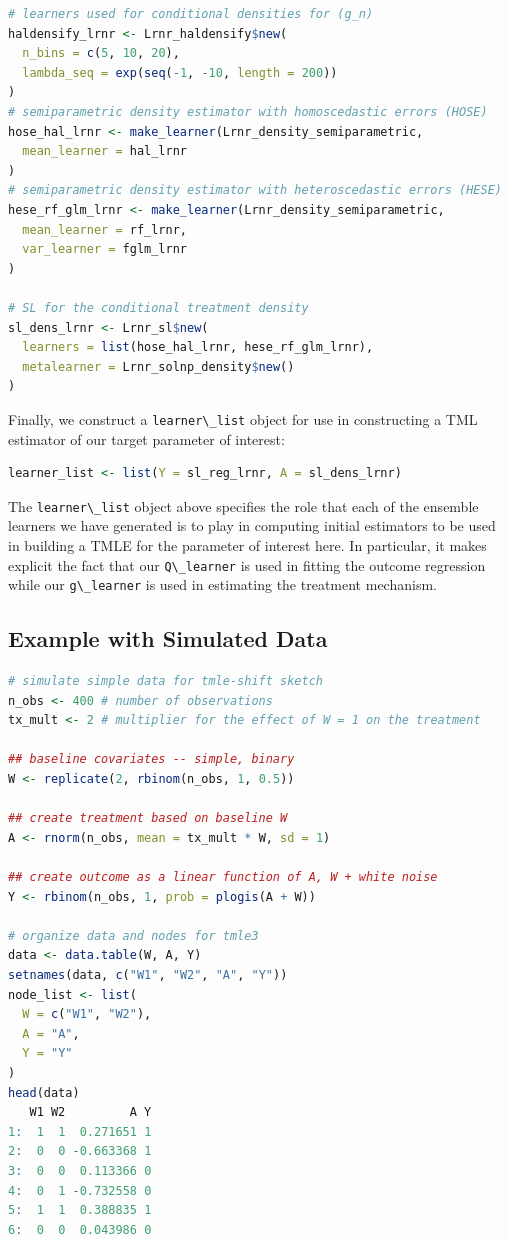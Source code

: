 \documentclass[
  12pt, krantz2,
]{krantz}
\newcommand{\passthrough}[1]{#1}
\newcommand{\1}{\mathbbm{1}}
\theoremstyle{definition}
\theoremstyle{definition}
\theoremstyle{definition}
\theoremstyle{definition}
\theoremstyle{remark}
\begin{document}
\begin{lstlisting}[language=R]
# learners used for conditional densities for (g_n)
haldensify_lrnr <- Lrnr_haldensify$new(
  n_bins = c(5, 10, 20),
  lambda_seq = exp(seq(-1, -10, length = 200))
)
# semiparametric density estimator with homoscedastic errors (HOSE)
hose_hal_lrnr <- make_learner(Lrnr_density_semiparametric,
  mean_learner = hal_lrnr
)
# semiparametric density estimator with heteroscedastic errors (HESE)
hese_rf_glm_lrnr <- make_learner(Lrnr_density_semiparametric,
  mean_learner = rf_lrnr,
  var_learner = fglm_lrnr
)

# SL for the conditional treatment density
sl_dens_lrnr <- Lrnr_sl$new(
  learners = list(hose_hal_lrnr, hese_rf_glm_lrnr),
  metalearner = Lrnr_solnp_density$new()
)
\end{lstlisting}

Finally, we construct a \passthrough{\lstinline!learner\_list!} object for use in constructing a TML
estimator of our target parameter of interest:

\begin{lstlisting}[language=R]
learner_list <- list(Y = sl_reg_lrnr, A = sl_dens_lrnr)
\end{lstlisting}

The \passthrough{\lstinline!learner\_list!} object above specifies the role that each of the ensemble
learners we have generated is to play in computing initial estimators to be
used in building a TMLE for the parameter of interest here. In particular, it
makes explicit the fact that our \passthrough{\lstinline!Q\_learner!} is used in fitting the outcome
regression while our \passthrough{\lstinline!g\_learner!} is used in estimating the treatment mechanism.

\hypertarget{example-with-simulated-data}{%
\subsection{Example with Simulated Data}\label{example-with-simulated-data}}

\begin{lstlisting}[language=R]
# simulate simple data for tmle-shift sketch
n_obs <- 400 # number of observations
tx_mult <- 2 # multiplier for the effect of W = 1 on the treatment

## baseline covariates -- simple, binary
W <- replicate(2, rbinom(n_obs, 1, 0.5))

## create treatment based on baseline W
A <- rnorm(n_obs, mean = tx_mult * W, sd = 1)

## create outcome as a linear function of A, W + white noise
Y <- rbinom(n_obs, 1, prob = plogis(A + W))

# organize data and nodes for tmle3
data <- data.table(W, A, Y)
setnames(data, c("W1", "W2", "A", "Y"))
node_list <- list(
  W = c("W1", "W2"),
  A = "A",
  Y = "Y"
)
head(data)
   W1 W2         A Y
1:  1  1  0.271651 1
2:  0  0 -0.663368 1
3:  0  0  0.113366 0
4:  0  1 -0.732558 0
5:  1  1  0.388835 1
6:  0  0  0.043986 0
\end{lstlisting}
\end{document}
